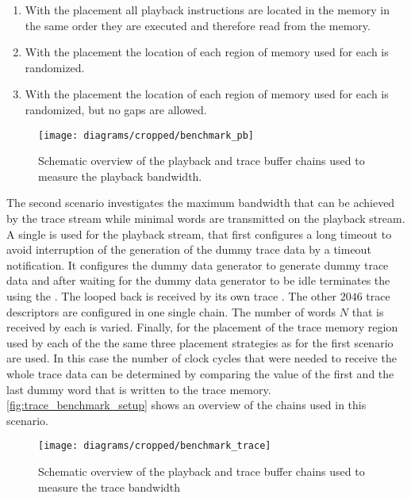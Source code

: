 \begin{enumerate}
    \item With the \linear{} placement all playback instructions are located in the \DDR{} memory in the same order they are executed and therefore read from the memory.
    \item With the \random{} placement the location of each region of memory used for each \descriptor{} is randomized.
    \item With the \randomDense{} placement the location of each region of memory used for each \descriptor{} is randomized, but no gaps are allowed.
\end{enumerate}

\begin{figure}[htbp]
\centerline{\texttt{[image: diagrams/cropped/benchmark\_pb]}}
\caption{Schematic overview of the playback and trace buffer chains used to measure the playback bandwidth.}\label{fig:pb_benchmark_setup}
\end{figure}

The second scenario investigates the maximum bandwidth that can be achieved by the trace stream while minimal words are transmitted on the playback stream. A single \descriptor{} is used for the playback stream, that first configures a long timeout to avoid interruption of the generation of the dummy trace data by a timeout notification. It configures the dummy data generator to generate dummy trace data and after waiting for the dummy data generator to be idle terminates the \PlaybackProgram{} using the \haltInstr{}. The looped back \haltInstr{} is received by its own trace \descriptor{}. The other $\num{2046}$ trace descriptors are configured in one single \descriptor{} chain. The number of words $N$ that is received by each \descriptor{} is varied. Finally, for the placement of the trace memory region used by each of the \descriptor{} the same three placement strategies as for the first scenario are used. In this case the number of clock cycles that were needed to receive the whole trace data can be determined by comparing the \systime{} value of the first and the last dummy word that is written to the trace memory. \autoref{fig:trace_benchmark_setup} shows an overview of the \descriptor{} chains used in this scenario.

\begin{figure}[htbp]
\centerline{\texttt{[image: diagrams/cropped/benchmark\_trace]}}
\caption{Schematic overview of the playback and trace buffer chains used to measure the trace bandwidth}\label{fig:trace_benchmark_setup}
\end{figure}

